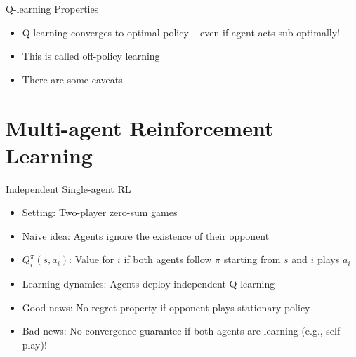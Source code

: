 \documentclass[11pt,aspectratio=169,handout]{beamer}
\begin{document}
  
  \begin{frame}{Q-learning Properties}
   \begin{itemize}
   \setlength{\itemsep}{1em}
    \item Q-learning converges to optimal policy -- even if agent acts sub-optimally!
    \item This is called \alert{off-policy learning}
    \item There are some caveats
   \end{itemize}
  \end{frame}
  
  
 \section{Multi-agent Reinforcement Learning}
  
  
  \begin{frame}{Independent Single-agent RL}
   \begin{itemize}[<+->]
   \setlength{\itemsep}{1.2em}
    \item Setting: Two-player zero-sum games
    \item Naive idea: Agents \alert{ignore} the existence of their opponent
    \item $Q_i^\pi(s,a_i)$: Value for $i$ if both agents follow $\pi$ starting from $s$ and $i$ plays $a_i$
    \item Learning dynamics: Agents deploy \alert{independent Q-learning}
    \item {\color{darkgreen}Good news}: \alert{No-regret} property if opponent plays stationary policy
    \item \alert{Bad news}: No convergence guarantee if both agents are learning (e.g., \alert{self play})!
   \end{itemize}
  \end{frame}
  
\end{document}
